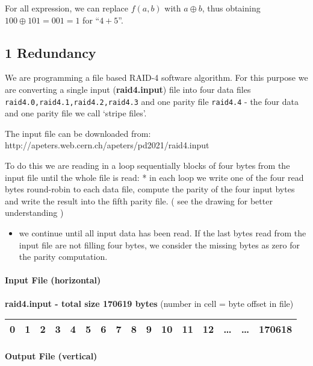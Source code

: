 \documentclass[11pt]{article}
\providecommand{\tightlist}{%
      \setlength{\itemsep}{0pt}\setlength{\parskip}{0pt}}
\begin{document}
For all expression, we can replace \(f(a,b)\) with \(a\oplus b\), thus
obtaining \(100\oplus 101 = 001 = 1\) for ``\(4+5\)''.

    \hypertarget{redundancy}{%
\subsection{1 Redundancy}\label{redundancy}}

We are programming a file based RAID-4 software algorithm. For this
purpose we are converting a single input (\textbf{raid4.input}) file
into four data files \texttt{raid4.0,raid4.1,raid4.2,raid4.3} and one
parity file \texttt{raid4.4} - the four data and one parity file we call
`stripe files'.

The input file can be downloaded from:
http://apeters.web.cern.ch/apeters/pd2021/raid4.input

To do this we are reading in a loop sequentially blocks of four bytes
from the input file until the whole file is read: * in each loop we
write one of the four read bytes round-robin to each data file, compute
the parity of the four input bytes and write the result into the fifth
parity file. ( see the drawing for better understanding )

\begin{itemize}
\tightlist
\item
  we continue until all input data has been read. If the last bytes read
  from the input file are not filling four bytes, we consider the
  missing bytes as zero for the parity computation.
\end{itemize}

\hypertarget{input-file-horizontal}{%
\paragraph{Input File (horizontal)}\label{input-file-horizontal}}

\textbf{raid4.input - total size 170619 bytes} (number in cell = byte
offset in file)

\begin{longtable}[]{@{}llllllllllllllll@{}}
\toprule
0 & 1 & 2 & 3 & 4 & 5 & 6 & 7 & 8 & 9 & 10 & 11 & 12 & \ldots{} &
\ldots{} & 170618\tabularnewline
\midrule
\endhead
\bottomrule
\end{longtable}

\hypertarget{output-file-vertical}{%
\paragraph{Output File (vertical)}\label{output-file-vertical}}
\end{document}
